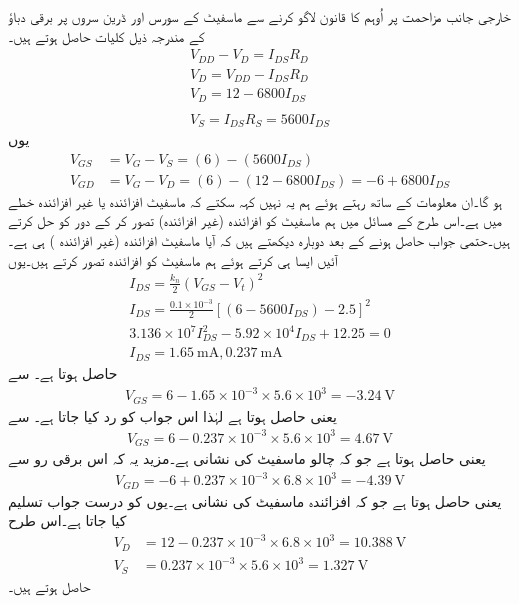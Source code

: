 خارجی جانب مزاحمت پر اُوہم کا قانون لاگو کرنے سے ماسفیٹ کے سورس اور ڈرین سروں پر برقی دباؤ کے مندرجہ ذیل کلیات حاصل ہوتے ہیں۔
\begin{align*}
V_{DD}-V_{D}=I_{DS}R_D\\
V_D=V_{DD}-I_{DS}R_D\\
V_D=12  - 6800 I_{DS}\\
\\
V_S=I_{DS}R_S=5600I_{DS}
\end{align*}
یوں
\begin{align*}
V_{GS}&=V_G -V_S = (6)-(5600 I_{DS})\\
V_{GD}&=V_G -V_D = (6)-\left(12-6800I_{DS} \right )=-6+6800I_{DS}
\end{align*}
ہو گا۔ان معلومات کے ساتھ رہتے ہوئے ہم یہ نہیں کہہ سکتے کہ ماسفیٹ افزائندہ یا غیر افزائندہ خطے میں ہے۔اس طرح کے مسائل میں ہم ماسفیٹ کو افزائندہ (غیر افزائندہ) تصور کر کے دور کو حل کرتے ہیں۔حتمی جواب حاصل ہونے کے بعد دوبارہ دیکھتے ہیں کہ آیا ماسفیٹ افزائندہ (غیر افزائندہ ) ہی ہے۔آئیں ایسا ہی کرتے ہوئے ہم ماسفیٹ کو افزائندہ تصور کرتے ہیں۔یوں
\begin{align*}
I_{DS}=\frac{k_n}{2} \left (V_{GS}-V_t \right )^{2}\\
I_{DS}=\frac{0.1 \times 10^{-3}}{2} \left[\left(6-5600 I_{DS}\right)-2.5 \right ]^2 \\
3.136 \times 10^{7} I_{DS}^{2}-5.92 \times 10^{4} I_{DS}+12.25=0\\
I_{DS}=\SI{1.65}{\milli \ampere} , \SI{0.237}{\milli \ampere}
\end{align*}
حاصل ہوتا ہے۔   سے 
\begin{align*}
V_{GS}=6-1.65 \times 10^{-3} \times 5.6 \times 10^{3}=\SI{-3.24}{\volt}
\end{align*}
یعنی   حاصل ہوتا ہے لہٰذا اس جواب کو رد کیا جاتا ہے۔  سے
\begin{align*}
V_{GS}=6-0.237 \times 10^{-3} \times 5.6 \times 10^{3}=\SI{4.67}{\volt}
\end{align*}
یعنی   حاصل ہوتا ہے جو کہ چالو ماسفیٹ کی نشانی ہے۔مزید یہ کہ اس برقی رو سے
\begin{align*}
V_{GD}=-6+0.237 \times 10^{-3} \times 6.8 \times 10^{3}=\SI{-4.39}{\volt}
\end{align*}
یعنی  حاصل ہوتا ہے جو کہ افزائندہ ماسفیٹ کی نشانی ہے۔یوں     کو درست جواب تسلیم کیا جاتا ہے۔اس طرح
\begin{align*}
V_D&=12-0.237 \times 10^{-3} \times 6.8 \times 10^{3}=\SI{10.388}{\volt}\\
V_S&=0.237 \times 10^{-3} \times 5.6 \times 10^{3}=\SI{1.327}{\volt}
\end{align*}
حاصل ہوتے ہیں۔

